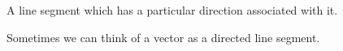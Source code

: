 A line segment which has a particular direction associated with it.
\par
Sometimes we can think of a vector as a directed line segment.